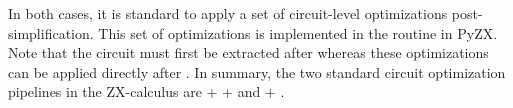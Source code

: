 In both cases, it is standard to apply a set of circuit-level optimizations post-simplification.
This set of optimizations is implemented in the  routine in PyZX.
Note that the circuit must first be extracted after  whereas these optimizations can be applied directly after .
In summary, the two standard circuit optimization pipelines in the ZX-calculus are  +  +  and  + .

